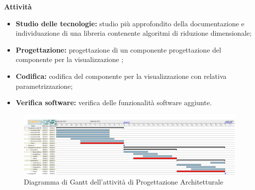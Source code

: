 \textbf{Attività}			

\begin{itemize}

\item \textbf{Studio delle tecnologie:} studio più approfondito della documentazione e individuazione di una libreria contenente algoritmi di riduzione dimensionale;
\item \textbf{Progettazione:} progettazione di un componente progettazione del componente per la visualizzazione ;
\item \textbf{Codifica:} codifica del componente per la visualizzazione con relativa parametrizzazione;
\item \textbf{Verifica software:} verifica delle funzionalità software aggiunte.
\end{itemize}

\begin{landscape}

\begin{figure}[h]
	\centering	
	\includegraphics[width=\linewidth]{Images/GanttPianificazioneProgettazioneArchitetturale.PNG}
	\caption{Diagramma di Gantt dell'attività di Progettazione Architetturale}
\end{figure}

\end{landscape}



